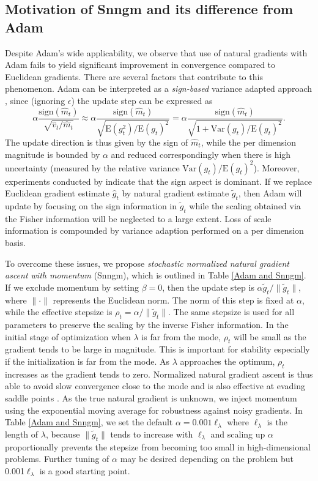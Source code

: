 \documentclass{statsoc}
\newcommand\E{{\text{E}}}
\newcommand\Var{{\text{Var}}}
\begin{document}
\subsection{Motivation of Snngm and its difference from Adam}
Despite Adam's wide applicability, we observe that use of natural gradients with Adam fails to yield significant improvement in convergence compared to Euclidean gradients. There are several factors that contribute to this phenomenon. Adam can be interpreted as a {\em sign-based} variance adapted approach \citep{Balles2018}, since (ignoring $\epsilon$) the update step can be expressed as 
\[
\alpha \frac{\text{sign}(\widehat{m}_t)}{\sqrt{\widehat{v}_t/\widehat{m}_t}} \approx \alpha \frac{\text{sign}(\widehat{m}_t)}{\sqrt{\E(g_t^2)/\E(g_t)^2}} 
= \alpha \frac{\text{sign}(\widehat{m}_t)}{\sqrt{1 + \Var(g_t)/\E(g_t)^2}}.
\]
The update direction is thus given by the sign of $\widehat{m}_t$, while the per dimension magnitude is bounded by $\alpha$ and reduced correspondingly when there is high uncertainty (measured by the relative variance $\Var(g_t)/\E(g_t)^2$). Moreover, experiments conducted by \cite{Balles2018} indicate that the sign aspect is dominant. If we replace Euclidean gradient estimate $\widehat{g}_t$ by natural gradient estimate $\tilde{g}_t$, then Adam will update by focusing on the sign information in $\tilde{g}_t$ while the scaling obtained via the Fisher information will be neglected to a large extent. Loss of scale information is compounded by variance adaption performed on a per dimension basis.

To overcome these issues, we propose {\em stochastic normalized natural gradient ascent with momentum} (Snngm), which is outlined in Table \ref{Adam and Snngm}. If we exclude momentum by setting $\beta = 0$, then the update step is $\alpha \widetilde{g}_t /\|\widetilde{g}_t \|$, where $\| \cdot \|$ represents the Euclidean norm. The norm of this step is fixed at $\alpha$, while the effective stepsize is $\rho_t = \alpha /\|\widetilde{g}_t \|$. The same stepsize is used for all parameters to preserve the scaling by the inverse Fisher information. In the initial stage of optimization when $\lambda$ is far from the mode, $\rho_t$ will be small as the gradient tends to be large in magnitude. This is important for stability especially if the initialization is far from the mode. As $\lambda$ approaches the optimum, $\rho_t$ increases as the gradient tends to zero. Normalized natural gradient ascent is thus able to avoid slow convergence close to the mode and is also effective at evading saddle points \citep{Hazan2015}. As the true natural gradient is unknown, we inject momentum using the exponential moving average for robustness against noisy gradients. In Table \ref{Adam and Snngm}, we set the default $\alpha = 0.001 \ell_\lambda$ where $\ell_\lambda$ is the length of $\lambda$, because $\|\widetilde{g}_t\|$ tends to increase with $\ell_\lambda$ and scaling up $\alpha$ proportionally prevents the stepsize from becoming too small in high-dimensional problems. Further tuning of $\alpha$ may be desired depending on the problem but 0.001$\ell_\lambda$ is a good starting point. 
\end{document}
